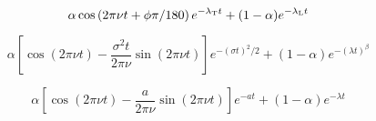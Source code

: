 \documentclass[12pt]{article}
\begin{document}
\begin{displaymath}
\alpha \cos\left(2\pi\nu t + \phi\pi/180\right) e^{-\lambda_{\rm T} t} + (1-\alpha) e^{-\lambda_{\rm L} t}
\end{displaymath}

\begin{displaymath}
\alpha \left[\cos(2\pi\nu t) -\frac{\sigma^2 t}{2\pi\nu}\sin(2\pi\nu t)\right] e^{-(\sigma t)^2/2} + (1-\alpha) e^{-(\lambda t)^\beta}
\end{displaymath}

\begin{displaymath}
\alpha \left[\cos(2\pi\nu t) -\frac{a}{2\pi\nu}\sin(2\pi\nu t)\right] e^{-a t} + (1-\alpha) e^{-\lambda t}
\end{displaymath}
\end{document}
